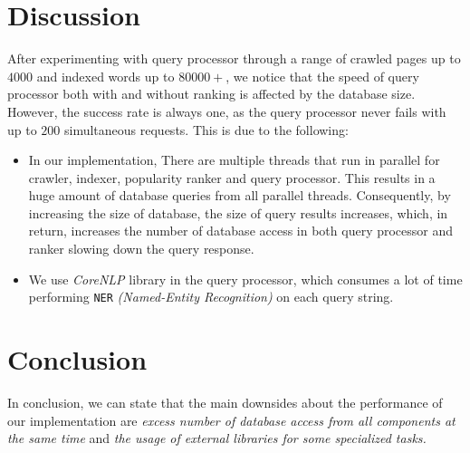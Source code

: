 \documentclass[12pt]{IEEEtran}
\begin{document}
\section{Discussion}
After experimenting with query processor through a range of crawled pages up to $4000$ and indexed words up to $80000+$, we notice that the speed of query processor both with and without ranking is affected by the database size. However, the success rate is always one, as the query processor never fails with up to $200$ simultaneous requests. This is due to the following:
\begin{itemize}
    \item In our implementation, There are multiple threads that run in parallel for crawler, indexer, popularity ranker and query processor. This results in a huge amount of database queries from all parallel threads. Consequently, by increasing the size of database, the size of query results increases, which, in return, increases the number of database access in both query processor and ranker slowing down the query response.
    \item We use \emph{CoreNLP} library in the query processor, which consumes a lot of time performing \texttt{NER} \emph{(Named-Entity Recognition)} on each query string.
\end{itemize}

\section{Conclusion}
In conclusion, we can state that the main downsides about the performance of our implementation are \emph{excess number of database access from all components at the same time} and \emph{the usage of external libraries for some specialized tasks.}
\end{document}
